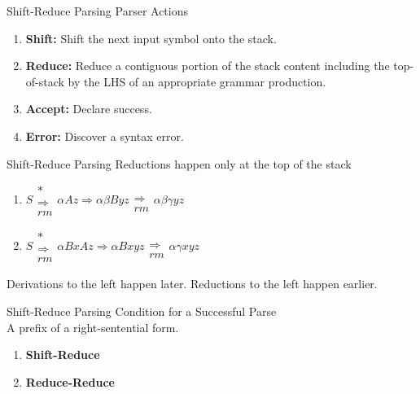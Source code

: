 \documentclass{beamer}
\begin{document}
\begin{frame}{Shift-Reduce Parsing}
{Parser Actions}
\begin{enumerate}
	\item \textbf{Shift:} Shift the next input symbol onto the stack.
	\item \textbf{Reduce: } Reduce a contiguous portion of the stack content including the top-of-stack by the LHS of an appropriate grammar production.
	\pause
	\item \textbf{Accept: }Declare success.
	\item \textbf{Error: }Discover a syntax error.
\end{enumerate}
\end{frame}

\begin{frame}{Shift-Reduce Parsing}
{Reductions happen only at the top of the stack}
\begin{enumerate}
	\item $S \substack{* \\ \Rightarrow \\ rm} \alpha A z \Rightarrow \alpha \beta Byz \substack{\\ \Rightarrow \\ rm} \alpha \beta \gamma yz$
	\item $S \substack{* \\ \Rightarrow \\ rm} \alpha B x A z \Rightarrow \alpha Bxyz \substack{\\ \Rightarrow \\ rm} \alpha \gamma x y z$ 
\end{enumerate}

\pause
Derivations to the left happen later. Reductions to the left happen earlier.
\end{frame}

\begin{frame}{Shift-Reduce Parsing}
{Condition for a Successful Parse}
\pause
{} \\
A prefix of a right-sentential form.
\pause

\vspace{1cm}
\begin{enumerate}
	\item \textbf{Shift-Reduce}
	\item \textbf{Reduce-Reduce}
\end{enumerate}
\end{frame}
\end{document}
